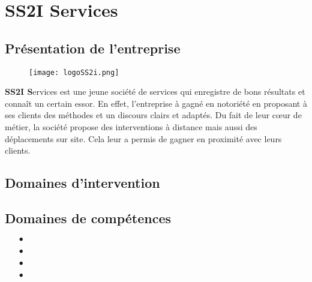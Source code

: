 \section{SS2I Services}
	\subsection{Présentation de l'entreprise}
		\vspace{0.3cm}

		\begin{wrapfigure}[10]{r}{6.5cm}
			\vspace{-0.7cm}
			\texttt{[image: logoSS2i.png]}
		\end{wrapfigure}
	
		\textbf{SS2I S}ervices est une jeune société de services qui enregistre de bons résultats et connaît un certain essor. En effet, l'entreprise à gagné en notoriété en proposant à ses clients des méthodes et un discours clairs et adaptés. Du fait de leur cœur de métier, la société propose des interventions à distance mais aussi des déplacements sur site. Cela leur a permis de gagner en proximité avec leurs clients.


	\subsection{Domaines d'intervention}
		\vspace{0.3cm}

		

	\subsection{Domaines de compétences}
		\vspace{0.3cm}

		\begin{itemize}
			\item[$\bullet$]

			\item[$\bullet$] 

			\item[$\bullet$] 

			\item[$\bullet$] 
		\end{itemize}

\newpage
